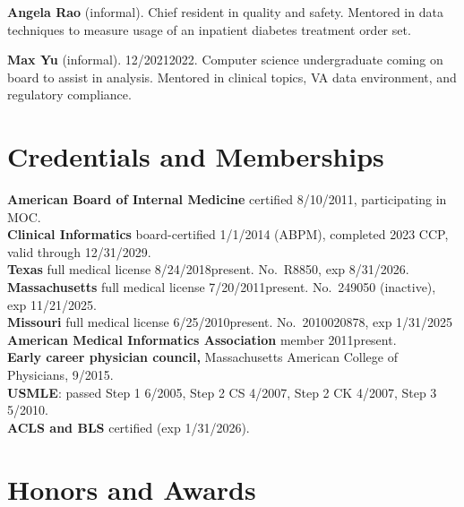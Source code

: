 \documentclass[10pt]{article}
\begin{document}
\textbf{Angela Rao} (informal). Chief resident in quality and safety.
Mentored in data techniques to measure usage of an inpatient diabetes
treatment order set.

\textbf{Max Yu} (informal). 12/2021\ndash{}2022. Computer science
undergraduate coming on board to assist in analysis. Mentored in
clinical topics, VA data environment, and regulatory compliance.




\section*{Credentials and Memberships}
\textbf{American Board of Internal Medicine} certified 8/10/2011,
participating in MOC.\\
\textbf{Clinical Informatics} board-certified 1/1/2014 (ABPM),
completed 2023 CCP, valid through 12/31/2029.\\  %
\textbf{Texas} full medical license 8/24/2018\ndash{}present. No.\ R8850,
exp 8/31/2026.\\
\textbf{Massachusetts} full medical license 7/20/2011\ndash{}present.
No.\ 249050 (inactive), exp 11/21/2025.\\
\textbf{Missouri} full medical license 6/25/2010\ndash{}present.
No.\ 2010020878, exp 1/31/2025\\
\textbf{American Medical Informatics Association} member
2011\ndash{}present.\\
\textbf{Early career physician council,} Massachusetts American
College of Physicians, 9/\ndash{}2015.\\
\textbf{USMLE}: passed Step 1 6/2005, Step 2 CS 4/2007, Step 2 CK
4/2007, Step 3 5/2010.\\
\textbf{ACLS and BLS} certified (exp 1/31/2026).




\section*{Honors and Awards}

\end{document}
